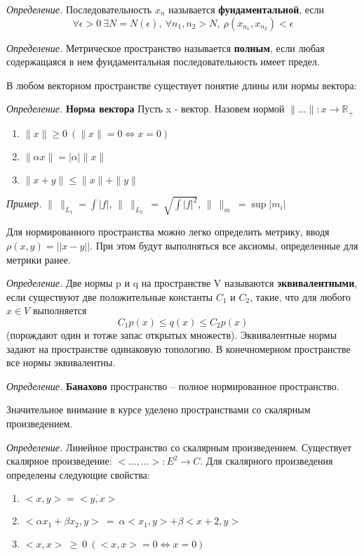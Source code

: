 \documentclass[12pt]{article}
\newcommand{\example}{{\itshape Пример. }}
\newcommand{\equals}{\Leftrightarrow}
\newcommand{\defi}{{\itshape Определение. }}
\renewcommand{\leq}{\leqslant}
\renewcommand{\geq}{\geqslant}
\begin{document}
	\defi Последовательность $x_n$ называется \textbf{фундаментальной}, если
	$$\forall \epsilon > 0 ~\exists N = N(\epsilon),~ \forall n_1, n_2 > N,~ \rho(x_{n_1}, x_{n_2}) < \epsilon$$

	\defi Метрическое пространство называется \textbf{полным}, если любая содержащаяся в нем фундаментальная последовательность имеет предел.
	
	В любом векторном пространстве существует понятие длины или нормы вектора:
	
	\defi \textbf{Норма вектора} Пусть x - вектор. Назовем нормой $\|...\| : x \rightarrow \mathbb{R_+}$
	\begin{enumerate}
		\item $\|x\| \geq 0 ~(\|x\| = 0 \equals x = 0)$
		\item $\|\alpha x\| = |\alpha| \|x\|$
		\item $\|x + y\| \leq \|x\| + \|y\|$
	\end{enumerate}
	
	\example $\|~\|_{L_1} = \int {|f|}$, $\|~\|_{L_2} ~=~ \sqrt{\int {|f|^2}}$,  $\|~\|_{m} ~= \sup {|m_i|}$
	
	Для нормированного пространства можно легко определить метрику, вводя $\rho(x,y) = ||x-y||$. При этом будут выполняться все аксиомы,
	определенные для метрики ранее.
	
	\defi Две нормы p и q на пространстве V называются \textbf{эквивалентными}, если существуют две положительные константы $C_1$ и $C_2$,
	такие, что для любого $x \in V$ выполняется 
	$$C_1 p(x) \leq q(x) \leq C_2 p(x)$$ (порождают один и тотже запас открытых множеств).
	Эквивалентные нормы задают на пространстве одинаковую топологию. В конечномерном пространстве все нормы эквивалентны.
	
	\defi \textbf{Банахово} пространство -- полное нормированное пространство.
	
	Значительное внимание в курсе уделено пространствами со скалярным произведением.
	
	\defi Линейное пространство со скалярным произведением. Существует скалярное произведение: $ <...,...> : E^2 \rightarrow C$.
	Для скалярного произведения определены следующие свойства:
	\begin{enumerate} 
		\item $<x,y> = \overline{<y,x>}$
		\item $<\alpha x_1 + \beta x_2, y> ~= ~\alpha <x_1, y> + \beta <x+2, y>$
		\item $<x, x> ~\geq ~0 ~(<x, x> = 0 \equals x = 0)$
	\end{enumerate}
	
\end{document}
